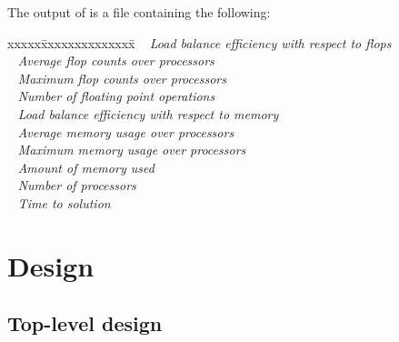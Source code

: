 \documentclass[10pt]{article}
\begin{document}
The output of  is a file containing the following:

\begin{tabbing}
xxxxx\=xxxxxxxxxxxxxx\=\kill
\> \todo\  \>    \textit{Load balance efficiency with respect to flops}\\
\> \todo\  \> \textit{Average flop counts over processors} \\
\> \todo\  \> \textit{Maximum flop counts over processors} \\
\> \todo\  \> \textit{Number of floating point operations} \\
\> \todo\  \>    \textit{Load balance efficiency with respect to memory}\\
\> \todo\  \> \textit{Average memory usage over processors} \\
\> \todo\  \>    \textit{Maximum memory usage over processors} \\
\> \todo\  \> \textit{Amount of memory used} \\
\> \todo\  \> \textit{Number of processors} \\
\> \todo\  \>  \textit{Time to solution}
\end{tabbing}


\section{ Design} \label{s:design}

\subsection{Top-level design} \label{ss:design}

\subsubsection{}

\end{document}
